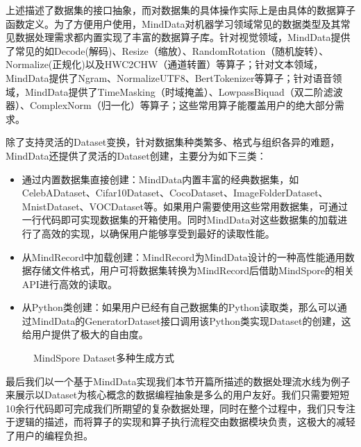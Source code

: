 \documentclass[letterpaper,10pt,english]{sphinxmanual}
\begin{document}
\sphinxAtStartPar
上述描述了数据集的接口抽象，而对数据集的具体操作实际上是由具体的数据算子函数定义。为了方便用户使用，MindData对机器学习领域常见的数据类型及其常见数据处理需求都内置实现了丰富的数据算子库。针对视觉领域，MindData提供了常见的如Decode(解码)、Resize（缩放）、RandomRotation（随机旋转）、Normalize(正规化)以及HWC2CHW（通道转置）等算子；针对文本领域，MindData提供了Ngram、NormalizeUTF8、BertTokenizer等算子；针对语音领域，MindData提供了TimeMasking（时域掩盖）、LowpassBiquad（双二阶滤波器）、ComplexNorm（归一化）等算子；这些常用算子能覆盖用户的绝大部分需求。

\sphinxAtStartPar
除了支持灵活的Dataset变换，针对数据集种类繁多、格式与组织各异的难题，MindData还提供了灵活的Dataset创建，主要分为如下三类：
\begin{itemize}
\item {} 
\sphinxAtStartPar
通过内置数据集直接创建：MindData内置丰富的经典数据集，如CelebADataset、Cifar10Dataset、CocoDataset、ImageFolderDataset、MnistDataset、VOCDataset等。如果用户需要使用这些常用数据集，可通过一行代码即可实现数据集的开箱使用。同时MindData对这些数据集的加载进行了高效的实现，以确保用户能够享受到最好的读取性能。

\item {} 
\sphinxAtStartPar
从MindRecord中加载创建：MindRecord为MindData设计的一种高性能通用数据存储文件格式，用户可将数据集转换为MindRecord后借助MindSpore的相关API进行高效的读取。

\item {} 
\sphinxAtStartPar
从Python类创建：如果用户已经有自己数据集的Python读取类，那么可以通过MindData的GeneratorDataset接口调用该Python类实现Dataset的创建，这给用户提供了极大的自由度。

\end{itemize}

\begin{figure}[H]
\centering
\capstart

\noindent{}
\caption{MindSpore Dataset多种生成方式}\label{\detokenize{chapter_data_processing/program_model:id14}}\end{figure}

\sphinxAtStartPar
最后我们以一个基于MindData实现我们本节开篇所描述的数据处理流水线为例子来展示以Dataset为核心概念的数据编程抽象是多么的用户友好。我们只需要短短10余行代码即可完成我们所期望的复杂数据处理，同时在整个过程中，我们只专注于逻辑的描述，而将算子的实现和算子执行流程交由数据模块负责，这极大的减轻了用户的编程负担。
\end{document}
